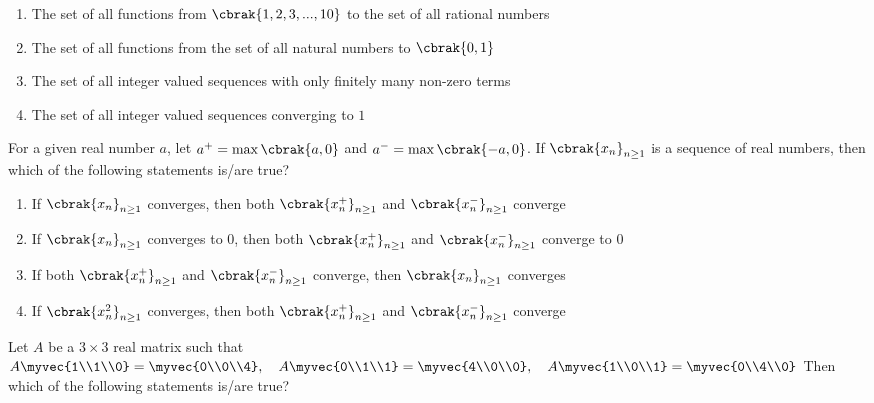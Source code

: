 \begin{enumerate}
\item The set of all functions from $\cbrak{1, 2, 3, ..., 10}$ to the set of all rational numbers
\item The set of all functions from the set of all natural numbers to $\cbrak{0,1}$
\item The set of all integer valued sequences with only finitely many non-zero terms
\item The set of all integer valued sequences converging to $1$
\end{enumerate}

\item For a given real number $a$, let $a^+ = \max\cbrak{a,0}$ and $a^- = \max\cbrak{-a,0}$.
      If $\cbrak{x_n}_{n\ge1}$ is a sequence of real numbers, then which of the following statements is/are true?

\begin{enumerate}
\item If $\cbrak{x_n}_{n\ge1}$ converges, then both $\cbrak{x_n^+}_{n\ge1}$ and $\cbrak{x_n^-}_{n\ge1}$ converge
\item If $\cbrak{x_n}_{n\ge1}$ converges to $0$, then both $\cbrak{x_n^+}_{n\ge1}$ and $\cbrak{x_n^-}_{n\ge1}$ converge to $0$
\item If both $\cbrak{x_n^+}_{n\ge1}$ and $\cbrak{x_n^-}_{n\ge1}$ converge, then $\cbrak{x_n}_{n\ge1}$ converges
\item If $\cbrak{x_n^2}_{n\ge1}$ converges, then both $\cbrak{x_n^+}_{n\ge1}$ and $\cbrak{x_n^-}_{n\ge1}$ converge
\end{enumerate}
\item Let $A$ be a $3\times3$ real matrix such that 
$A\myvec{1\\1\\0} = \myvec{0\\0\\4}, \quad A\myvec{0\\1\\1} = \myvec{4\\0\\0}, \quad A\myvec{1\\0\\1} = \myvec{0\\4\\0}$
Then which of the following statements is/are true?

